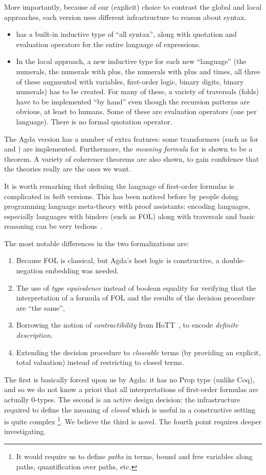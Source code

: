 \documentclass[fleqn]{llncs}
\begin{document}
More importantly, because of our (explicit) choice to contrast the
global and local approaches, each version uses different infrastructure to
reason about syntax.
\begin{itemize}
\item {\churchuqe} has a built-in inductive type of ``all syntax'',
along with quotation and evaluation operators for the entire language
of expressions.
\item In the local approach, a new inductive type for each new
``language'' (the numerals, the numerals with plus, the numerals with
plus and times, all three of these augmented with variables, first-order
logic, binary digits, binary numerals) has to be created.  For many of 
these, a variety of traversals (folds) have to be implemented ``by hand''
even though the recursion patterns are obvious, at least to humans.
Some of these are evaluation operators (one per language).  There is no
formal quotation operator.
\end{itemize}

The Agda version has a number of extra features: some transformers (such as
for  and ) are implemented.
Furthermore, the \emph{meaning formula} for  is
shown to be a theorem.  A variety of coherence theorems are also shown,
to gain confidence that the theories really are the ones we want.

It is worth remarking that defining the language of first-order formulas
is complicated in \emph{both} versions.  This has been noticed before by
people doing programming language meta-theory with proof assistants: 
encoding languages, especially languages with binders (such as FOL) along
with traversals and basic reasoning can be very tedious~\cite{poplmark}.

The most notable differences in the two formalizations are:
\begin{enumerate}
\item Because FOL is classical, but Agda's host logic is constructive,
a double-negation embedding was needed.
\item The use of \emph{type equivalence} instead of boolean equality for
verifying that the interpretation of a formula of FOL and the results
of the decision procedure are ``the same'',
\item Borrowing the notion of \emph{contractibility} from 
HoTT~\cite{hottbook}, to encode \emph{definite description}.
\item Extending the decision procedure to \emph{closeable} terms (by
providing an explicit, total valuation) instead of restricting to
closed terms.
\end{enumerate}
The first is basically forced upon us by Agda: it has no Prop type (unlike
Coq), and so we do not know a priori that all interpretations of
first-order formulas are actually $0$-types.  The second is an active
design decision: the infrastructure required to define the meaning of
\emph{closed} which is useful in a constructive setting is quite complex%
\footnote{It would require us to define \emph{paths} in terms, bound and
free variables along paths, quantification over paths, etc.}.  We believe
the third is novel.  The fourth point requires deeper investigating.
\end{document}
